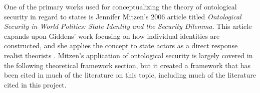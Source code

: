 


One of the primary works used for conceptualizing the theory of ontological security in regard to states is Jennifer Mitzen's \parencite*{mitzenOntologicalSecurityWorld2006} 2006 article titled \textit{Ontological Security in World Politics: State Identity and the Security Dilemma}. This article expands upon Giddens' \parencite*{giddensModernitySelfidentitySelf2009} work focusing on how individual identities are constructed, and she applies the concept to state actors as a direct response realist theorists \Parencite[][p. 342-344]{mitzenOntologicalSecurityWorld2006}. Mitzen's \parencite*{mitzenOntologicalSecurityWorld2006} application of ontological security is largely covered in the following theoretical framework section, but it created a framework that has been cited in much of the literature on this topic, including much of the literature cited in this project.


